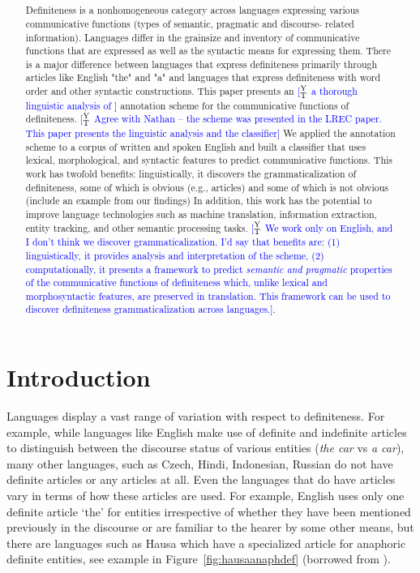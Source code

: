 \documentclass[11pt,letterpaper]{article}
\title{\draftnotice{Title, author list not final. Page limit: 5 + 2 bib} \ab{Learning Definiteness across Languages using Classifiers} \nss{maybe: A Classification and Classifier for Cross-linguistic Functions of Definiteness}}
\date{}
\newcommand{\ensuretext}[1]{#1}
\newcommand{\ytmarker}{\ensuretext{\textcolor{blue}{\ensuremath{^{\textsc{Y}}_{\textsc{T}}}}}}
\newcommand{\arkcomment}[3]{\ensuretext{\textcolor{#3}{[#1 #2]}}}
\newcommand{\yt}[1]{\arkcomment{\ytmarker}{#1}{blue}}
\begin{document}
\maketitle
\begin{abstract}
Definiteness is a nonhomogeneous category across languages expressing various communicative functions (types of semantic, pragmatic and discourse- related information).   Languages differ in the grainsize and inventory of communicative functions  that are expressed as well as the syntactic means for expressing them.  There is a major difference between languages that express definiteness primarily through articles like English "the" and "a" and languages that express definiteness with word order and other syntactic constructions.   This paper presents an \yt{ a thorough linguistic analysis of } annotation scheme for the communicative functions of definiteness. \yt{Agree with Nathan -- the scheme was presented in the LREC paper. This paper presents the linguistic analysis and the classifier}  We applied the annotation scheme to a corpus of written and spoken English and built a classifier that uses lexical, morphological, and syntactic features to predict communicative functions.   This work has twofold benefits: linguistically, it discovers the grammaticalization of definiteness, some of which is obvious (e.g., articles) and some of which is not obvious (include an example from our findings) 
In addition, this work has the potential to improve language technologies such as machine translation, information extraction, entity tracking, and other semantic processing tasks. \yt{We work only on English, and I don't think we discover grammaticalization. I'd say that benefits are: (1) linguistically, it provides analysis and interpretation of the scheme, (2) computationally,  it presents a framework to predict \textit{semantic and pragmatic} properties of the communicative functions of definiteness which, unlike lexical and morphosyntactic features, are preserved in translation.  This framework can be used to discover definiteness grammaticalization across languages.}.  
\end{abstract}

\section{Introduction}

Languages display a vast range of variation with respect to definiteness. For example, while languages like English make use of definite and indefinite articles to distinguish between the discourse status of various entities ({\it the car} vs {\it a car}), many other languages, such as Czech, Hindi, Indonesian, Russian do not have definite articles or any articles at all. Even the languages that do have articles vary in terms of how these articles are used. For example, English uses only one definite article ‘the’ for entities irrespective of whether they have been mentioned previously in the discourse or are familiar to the hearer by some other means, but there are languages such as Hausa which have a specialized article for anaphoric definite entities, see example in Figure~\ref{fig:hausaanaphdef} (borrowed from \cite{lyons99}). 
\end{document}

